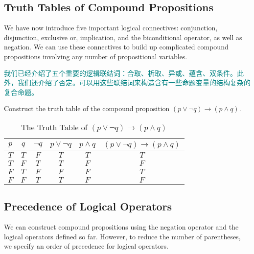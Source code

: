 \documentclass[12pt, a4paper]{article} %
\begin{document}
\subsection{Truth Tables of Compound Propositions}

We have now introduce five important logical connectives: conjunction, disjunction, exclusive or, implication, and the biconditional operator, as well as negation. We can use these connectives to build up complicated compound propositions involving any number of propositional variables.

\textcolor{teal}{
    我们已经介绍了五个重要的逻辑联结词：合取、析取、异或、蕴含、双条件。此外，我们还介绍了否定。可以用这些联结词来构造含有一些命题变量的结构复杂的复合命题。
}

\begin{example}
    Construct the truth table of the compound proposition $(p \vee \neg q) \to (p \wedge q)$.
\end{example}

\begin{table}[H]
    \centering
    \caption{The Truth Table of $(p \vee \neg q) \to (p \wedge q)$}
    \begin{tabular}{cc|ccc|c}
        \toprule
        $p$ & $q$ & $\neg q$ & $p \vee \neg q$ & $p \wedge q$ & $(p \vee \neg q) \to (p \wedge q)$ \\
        \midrule
        $T$ & $T$ & $F$      & $T$             & $T$          & $T$                                \\
        $T$ & $F$ & $T$      & $T$             & $F$          & $F$                                \\
        $F$ & $T$ & $F$      & $F$             & $F$          & $T$                                \\
        $F$ & $F$ & $T$      & $T$             & $F$          & $F$                                \\
        \bottomrule
    \end{tabular}%
    \label{tab:7}%
\end{table}%

\subsection{Precedence of Logical Operators}

We can construct compound propositions using the negation operator and the logical operators defined so far.
However, to reduce the number of parentheses, we specify an order of precedence for logical operators.
\end{document}
